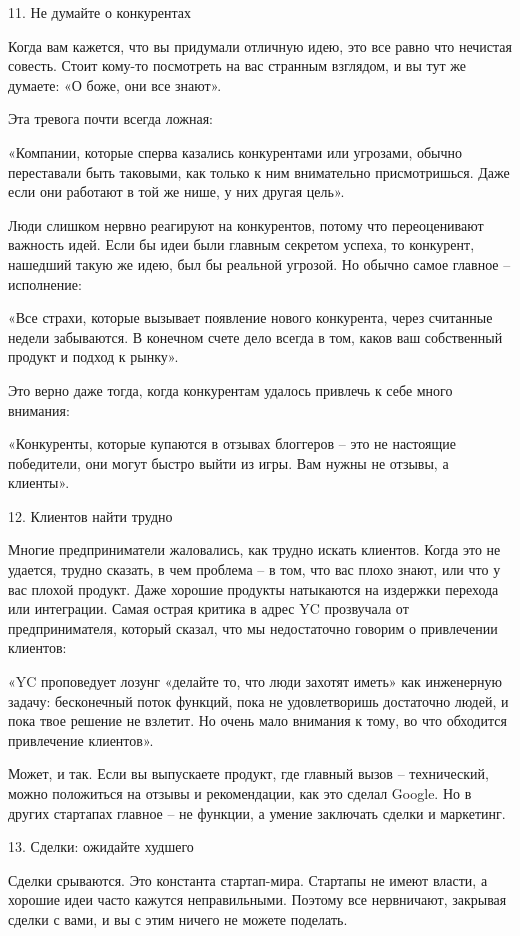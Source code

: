 \documentclass[ebook,12pt,oneside,openany]{memoir}
\begin{document}
11. Не думайте о конкурентах

Когда вам кажется, что вы придумали отличную идею, это все равно что
нечистая совесть. Стоит кому-то посмотреть на вас странным взглядом, и
вы тут же думаете: «О боже, они все знают».

Эта тревога почти всегда ложная:

«Компании, которые сперва казались конкурентами или угрозами, обычно
переставали быть таковыми, как только к ним внимательно присмотришься.
Даже если они работают в той же нише, у них другая цель».

Люди слишком нервно реагируют на конкурентов, потому что переоценивают
важность идей. Если бы идеи были главным секретом успеха, то
конкурент, нашедший такую же идею, был бы реальной угрозой. Но обычно
самое главное – исполнение:

«Все страхи, которые вызывает появление нового конкурента, через
считанные недели забываются. В конечном счете дело всегда в том, каков
ваш собственный продукт и подход к рынку».

Это верно даже тогда, когда конкурентам удалось привлечь к себе много
внимания:

«Конкуренты, которые купаются в отзывах блоггеров – это не настоящие
победители, они могут быстро выйти из игры. Вам нужны не отзывы, а
клиенты».

12. Клиентов найти трудно

Многие предприниматели жаловались, как трудно искать клиентов. Когда
это не удается, трудно сказать, в чем проблема – в том, что вас плохо
знают, или что у вас плохой продукт. Даже хорошие продукты натыкаются
на издержки перехода или интеграции. Самая острая критика в адрес YC
прозвучала от предпринимателя, который сказал, что мы недостаточно
говорим о привлечении клиентов:

«YC проповедует лозунг «делайте то, что люди захотят иметь» как
инженерную задачу: бесконечный поток функций, пока не удовлетворишь
достаточно людей, и пока твое решение не взлетит. Но очень мало
внимания к тому, во что обходится привлечение клиентов».

Может, и так. Если вы выпускаете продукт, где главный вызов –
технический, можно положиться на отзывы и рекомендации, как это сделал
Google. Но в других стартапах главное – не функции, а умение заключать
сделки и маркетинг.

13. Сделки: ожидайте худшего

Сделки срываются. Это константа стартап-мира. Стартапы не имеют
власти, а хорошие идеи часто кажутся неправильными. Поэтому все
нервничают, закрывая сделки с вами, и вы с этим ничего не можете
поделать.
\end{document}
